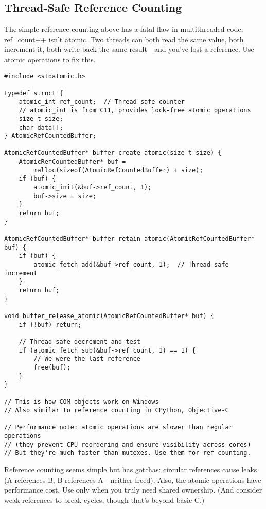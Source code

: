 \subsection{Thread-Safe Reference Counting}

The simple reference counting above has a fatal flaw in multithreaded code: ref\_count++ isn't atomic. Two threads can both read the same value, both increment it, both write back the same result---and you've lost a reference. Use atomic operations to fix this.

\begin{lstlisting}
#include <stdatomic.h>

typedef struct {
    atomic_int ref_count;  // Thread-safe counter
    // atomic_int is from C11, provides lock-free atomic operations
    size_t size;
    char data[];
} AtomicRefCountedBuffer;

AtomicRefCountedBuffer* buffer_create_atomic(size_t size) {
    AtomicRefCountedBuffer* buf =
        malloc(sizeof(AtomicRefCountedBuffer) + size);
    if (buf) {
        atomic_init(&buf->ref_count, 1);
        buf->size = size;
    }
    return buf;
}

AtomicRefCountedBuffer* buffer_retain_atomic(AtomicRefCountedBuffer* buf) {
    if (buf) {
        atomic_fetch_add(&buf->ref_count, 1);  // Thread-safe increment
    }
    return buf;
}

void buffer_release_atomic(AtomicRefCountedBuffer* buf) {
    if (!buf) return;

    // Thread-safe decrement-and-test
    if (atomic_fetch_sub(&buf->ref_count, 1) == 1) {
        // We were the last reference
        free(buf);
    }
}

// This is how COM objects work on Windows
// Also similar to reference counting in CPython, Objective-C

// Performance note: atomic operations are slower than regular operations
// (they prevent CPU reordering and ensure visibility across cores)
// But they're much faster than mutexes. Use them for ref counting.
\end{lstlisting}

\begin{warningbox}
Reference counting seems simple but has gotchas: circular references cause leaks (A references B, B references A---neither freed). Also, the atomic operations have performance cost. Use only when you truly need shared ownership. (And consider weak references to break cycles, though that's beyond basic C.)
\end{warningbox}

